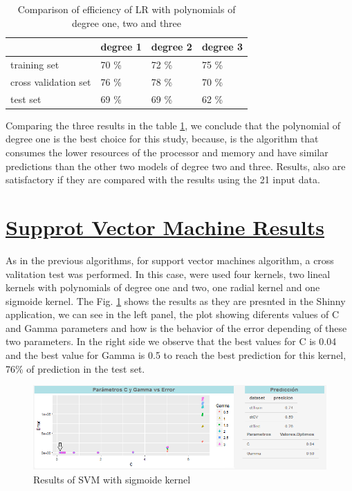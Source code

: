 \documentclass[]{book}
\begin{document}
\begin{table}[ht]
\centering
\caption{Comparison of efficiency of LR with polynomials of degree one, two and three}
\label{tab:results-of-efficiency-logistic-regression}
\begin{tabular}{llll}
\hline
                     & degree 1 & degree 2 & degree 3 \\ \hline
training set         & 70 \%    & 72 \%    & 75 \%    \\
cross validation set & 76 \%    & 78 \%    & 70 \%    \\
test set             & 69 \%    & 69 \%    & 62 \%    \\ \hline
\end{tabular}
\end{table}

Comparing the three results in the table
\ref{tab:results-of-efficiency-logistic-regression}, we conclude that
the polynomial of degree one is the best choice for this study, because,
is the algorithm that consumes the lower resources of the processor and
memory and have similar predictions than the other two models of degree
two and three. Results, also are satisfactory if they are compared with
the results using the 21 input data.

\section{\texorpdfstring{\protect\hyperlink{SVM-results}{Supprot Vector
Machine
Results}}{Supprot Vector Machine Results}}\label{supprot-vector-machine-results}

As in the previous algorithms, for support vector machines algorithm, a
cross valitation test was performed. In this case, were used four
kernels, two lineal kernels with polynomials of degree one and two, one
radial kernel and one sigmoide kernel. The Fig.
\ref{fig:SVM-sigmoide-2-flecha} shows the results as they are presnted
in the Shinny application, we can see in the left panel, the plot
showing diferents values of C and Gamma parameters and how is the
behavior of the error depending of these two parameters. In the right
side we observe that the best values for C is 0.04 and the best value
for Gamma is 0.5 to reach the best prediction for this kernel, 76\% of
prediction in the test set.

\begin{figure}[H]

{\centering \includegraphics[width=0.8\linewidth]{images/SVM-sigmoide-2-flecha} 

}

\caption{Results of SVM with sigmoide kernel}\label{fig:SVM-sigmoide-2-flecha}
\end{figure}
\end{document}
